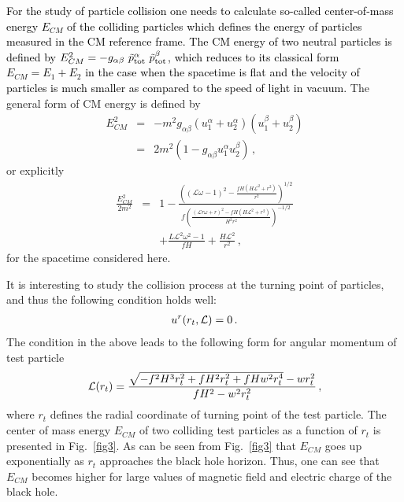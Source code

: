 \documentclass[showpacs,twocolumn,superscriptaddress]{revtex4}
\begin{document}
\textcolor{black}{For the study of particle collision one needs to calculate so-called center-of-mass energy $E_{CM}$ of the colliding particles which defines the energy of particles measured in the CM reference frame.
The CM energy of two neutral particles is defined by $E^2_{CM}=-g_{\alpha\beta} \  \tilde{p}^{\alpha}_{\rm tot} \  \tilde{p}^{\beta}_{\rm tot}$, which reduces to its classical form $E_{CM}=E_1+E_2$ in the case when the spacetime is flat and the velocity of particles is much smaller as compared to the speed of light in vacuum.} The general form of CM energy is defined by 
%
\begin{eqnarray} \label{CME}
\nonumber
E^2_{CM}&=&-m^2 g_{\alpha\beta} (u_1^\alpha+u_2^\alpha) (u_1^\beta+u_2^\beta)\\
&=& 2 m^2 (1-g_{\alpha\beta} u_1^\alpha u_2^\beta) \, ,
\end{eqnarray}
%
or explicitly
%
	\begin{eqnarray}
	\frac{E^2_{CM}}{2 m^2}&=&1-\frac{\left({(\mathcal{L} \omega-1)^2-\frac{f H \left(H \mathcal{L}^2+r^2\right)}{r^2}}\right)^{1/2}
		}{f
		\left(\frac{(\mathcal{L} r \omega+r)^2-f H \left(H \mathcal{L}^2+r^2\right)}{H^2 r^2}\right)^{-1/2} }\nonumber\\&&+ \frac{L\mathcal{L}^2 \omega^2-1}{fH}+\frac{H \mathcal{L}^2}{r^2}\, ,
	\end{eqnarray}
%
for the spacetime considered here.

It is interesting to study the collision process at the turning point of particles, and thus the following condition holds well:
%
\begin{eqnarray} \label{tpoint}
u^r(r_t,{\cal L})=0 \, .
\end{eqnarray}
%
The condition in the above leads to the following form for angular momentum of test particle 
%
	\begin{eqnarray}
	{\cal L}(r_t)=\frac{\sqrt{-f^2 H^3 r_t^2+f H^2 r_t^2+f H w^2 r_t^4}-w r_t^2}{f H^2-w^2 r_t^2}\, ,
	\end{eqnarray}
%
where $r_t$ defines the radial coordinate of turning point of the test particle. The center of mass energy $E_{CM}$ of two colliding test particles as a function of $r_t$ is presented in Fig.~\ref{fig3}. As can be seen from Fig.~\ref{fig3} that $E_{CM}$ goes up exponentially as $r_t$ approaches the black hole horizon. Thus, one can see that $E_{CM}$ becomes higher for large values of magnetic field and electric charge of the black hole.
\end{document}
